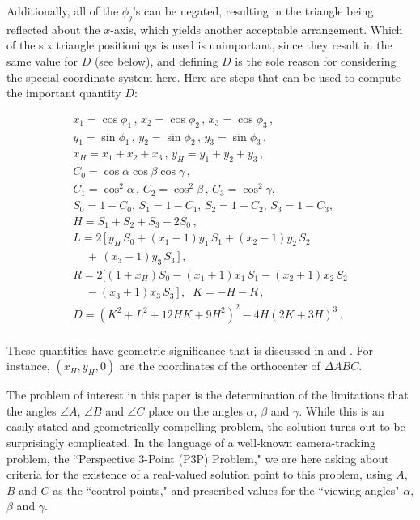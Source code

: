 \documentclass[a4paper, twoside]{article}
\begin{document}
Additionally, all of the $\phi_j$'s can be negated, resulting in the triangle being reflected about the $x$-axis, which yields another acceptable arrangement. Which of the six triangle positionings is used is unimportant, since they result in the same value for $D$ (see below), and defining $D$ is the sole reason for considering the special coordinate system here. Here are steps that can be used to compute the important quantity $D$:

\vspace{-2mm} 

$$\begin{array}{l}
x_1 = \cos\phi_1 \, , \, x_2 = \cos\phi_2 \, , \, x_3 = \cos\phi_3 \, , \\
y_1 = \sin\phi_1 \, , \, y_2 = \sin\phi_2 \, , \, y_3 = \sin\phi_3 \, , \\
x_H = x_1 + x_2 + x_3 \, , \, y_H = y_1 + y_2 + y_3 \, , \\ 
C_0 = \cos\alpha \cos\beta \cos\gamma \, , \\
C_1 = \cos^2\alpha \, , \, C_2 = \cos^2\beta \, , \, C_3 = \cos^2\gamma , \\
S_0 = 1 - C_0, \, S_1 = 1 - C_1, \, S_2 = 1 - C_2, \, S_3 = 1 - C_3, \\
H = S_1 + S_2 + S_3 - 2 S_0 \, , \\ 
L = 2 \, [ \, y_H \, S_0 + (x_1-1)y_1 \, S_1 + (x_2-1)y_2 \, S_2 \\ 
\; \; \; \; + \, (x_3-1)y_3 \, S_3 \, ] \, , \\
R = 2[(1+x_H) S_0 - (x_1+1)x_1 \, S_1 - (x_2+1)x_2 \, S_2 \\ 
\; \; \; \; - (x_3+1)x_3 \, S_3 \, ] \, , \; \; K = -H - R \, , \\
D = (K^2+L^2+12H K+9H^2)^2 - 4H(2K+3H)^3 \, . \\

\end{array}$$ 

\vspace{2mm} 

\noindent These quantities have geometric significance that is discussed in \cite{R1} and \cite{RW}. For instance, $(x_H, y_H, 0)$ are the coordinates of the orthocenter of $\Delta ABC$.  

The problem of interest in this paper is the determination of the limitations that the angles $\angle A$, $\angle B$ and $\angle C$ place on the angles $\alpha$, $\beta$ and $\gamma$. While this is an easily stated and geometrically compelling problem, the solution turns out to be surprisingly complicated. In the language of a well-known camera-tracking problem, the ``Perspective 3-Point (P3P) Problem," we are here asking about criteria for the existence of a real-valued solution point to this problem, using $A$, $B$ and $C$ as the ``control points," and prescribed values for the ``viewing angles" $\alpha$, $\beta$ and $\gamma$. 
\end{document}
